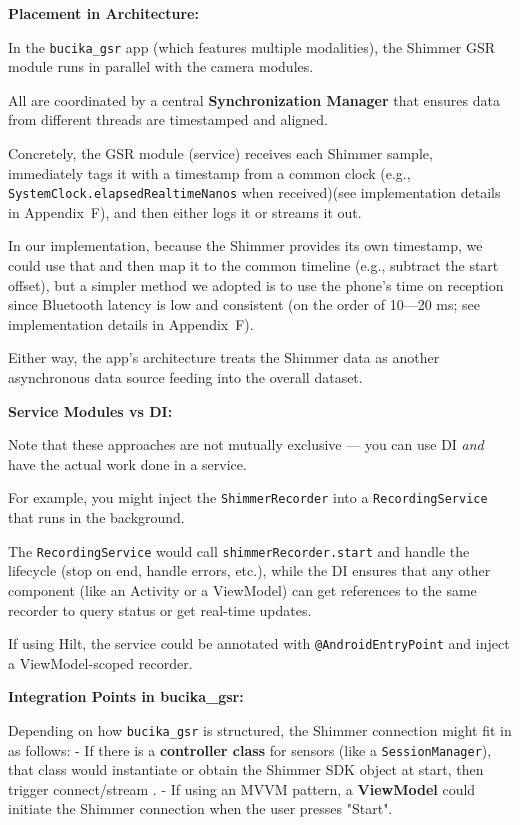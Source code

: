 {{\textbf{Placement in Architecture:}

In the \texttt{bucika_gsr} app (which features multiple modalities), the Shimmer
GSR module runs in parallel with the camera modules.

All are coordinated by a central \textbf{Synchronization Manager}
 that ensures data from different threads are timestamped and aligned.

Concretely, the GSR module (service) receives each Shimmer sample, immediately
tags it with a timestamp from a common clock (e.g.,
\texttt{SystemClock.elapsedRealtimeNanos} when received)(see implementation
details in Appendix~F), and then either logs it or streams it out.

In our implementation, because the Shimmer provides its own timestamp, we could
use that and then map it to the common timeline (e.g., subtract the start
offset), but a simpler method we adopted is to use the phone's time on reception
since Bluetooth latency is low and consistent (on the order of 10---20 ms; see
implementation details in Appendix~F).

Either way, the app's architecture treats the Shimmer data as another
asynchronous data source feeding into the overall dataset.

\textbf{Service Modules vs DI:}

Note that these approaches are not mutually exclusive --- you can use DI \textit{and} have the actual work done in a service.

For example, you might inject the \texttt{ShimmerRecorder} into a
\texttt{RecordingService} that runs in the background.

The \texttt{RecordingService} would call \texttt{shimmerRecorder.start} and
handle the lifecycle (stop on end, handle errors, etc.), while the DI ensures
that any other component (like an Activity or a ViewModel) can get references to
the same recorder to query status or get real-time updates.

If using Hilt, the service could be annotated with \texttt{@AndroidEntryPoint}
and inject a ViewModel-scoped recorder.

\textbf{Integration Points in bucika_gsr:}

Depending on how \texttt{bucika_gsr} is structured, the Shimmer connection might fit in as follows: - If there is a \textbf{controller class}
for sensors (like a \texttt{SessionManager}), that class would instantiate or obtain the Shimmer SDK object at start, then trigger connect/stream
. - If using an MVVM pattern, a \textbf{ViewModel}
 could initiate the Shimmer connection when the user presses "Start".

}}
